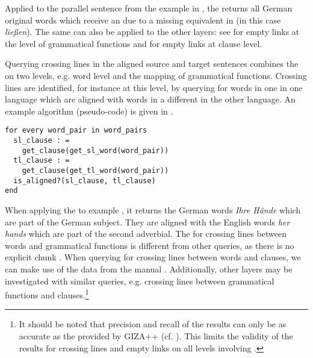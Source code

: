 \documentclass[output=paper]{LSP/langsci}
\begin{document}
Applied to the parallel sentence from the  example in , the   returns all German original words which receive an  due to a missing equivalent in  (in this case \textit{ließen}). The same  can also be applied to the other  layers: see  for empty links at the level of grammatical functions and  for empty links at clause level.

Querying crossing lines in the aligned source and target sentences combines the  on two levels, e.g. word level and the mapping of grammatical functions. Crossing lines are identified, for instance at this level, by querying for words in one  in one language which are aligned with words in a different  in the other language. An example algorithm (pseudo-code) is given in .

\ea
\begin{lstlisting}
for every word_pair in word_pairs 
  sl_clause : = 
    get_clause(get_sl_word(word_pair)) 
  tl_clause : = 
    get_clause(get_tl_word(word_pair)) 
  is_aligned?(sl_clause, tl_clause) 
end 
\end{lstlisting}
\label{ex:culo:pseudocode}
\z

When applying the  to example , it returns the German words \textit{Ihre Hände} which are part of the German subject. They are aligned with the English words \textit{her hands} which are part of the second adverbial. The  for crossing lines between words and grammatical functions is different from other queries, as there is no explicit chunk . When querying for crossing lines between words and clauses, we can make use of the data from the manual . Additionally, other  layers may be investigated with similar queries, e.g. crossing lines between grammatical functions and clauses.\footnote{It should be noted that precision and recall of the  results can only be as accurate as the  provided by GIZA++ (cf. \citealt{CuloEtAl2008}). This limits the validity of the  results for crossing lines and empty links on all levels involving .}
\end{document}
